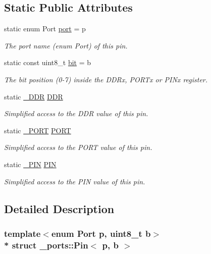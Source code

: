 \subsection*{Static Public Attributes}
\begin{DoxyCompactItemize}
\item 
static enum Port \hyperlink{struct__ports_1_1Pin_afaba9fcfbb706e21514f3ed3cd5dcac8}{port} = p
\begin{DoxyCompactList}\small\item\em The port name (enum Port) of this pin. \end{DoxyCompactList}\item 
static const uint8\+\_\+t \hyperlink{struct__ports_1_1Pin_acfe940a7c850df557698dc99a745df5e}{bit} = b
\begin{DoxyCompactList}\small\item\em The bit position (0-\/7) inside the D\+D\+Rx, P\+O\+R\+Tx or P\+I\+Nx register. \end{DoxyCompactList}\item 
static \hyperlink{struct__ports_1_1__Io}{\+\_\+\+D\+DR} \hyperlink{struct__ports_1_1Pin_a98b2b6c1bbac0b66435fa91223add866}{D\+DR}
\begin{DoxyCompactList}\small\item\em Simplified access to the D\+DR value of this pin. \end{DoxyCompactList}\item 
static \hyperlink{struct__ports_1_1__Io}{\+\_\+\+P\+O\+RT} \hyperlink{struct__ports_1_1Pin_a7ae4c8a631070ea0652b8ea59416bc37}{P\+O\+RT}
\begin{DoxyCompactList}\small\item\em Simplified access to the P\+O\+RT value of this pin. \end{DoxyCompactList}\item 
static \hyperlink{struct__ports_1_1__Io}{\+\_\+\+P\+IN} \hyperlink{struct__ports_1_1Pin_abb249dc14ab80843a95913e7c513dcf9}{P\+IN}
\begin{DoxyCompactList}\small\item\em Simplified access to the P\+IN value of this pin. \end{DoxyCompactList}\end{DoxyCompactItemize}


\subsection{Detailed Description}
\subsubsection*{template$<$enum Port p, uint8\+\_\+t b$>$\\*
struct \+\_\+ports\+::\+Pin$<$ p, b $>$}


